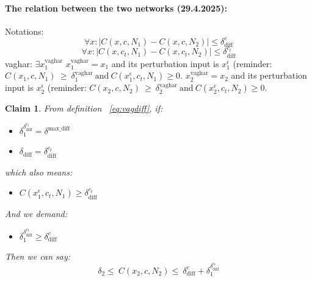\documentclass[11pt]{article}
\newtheorem{claim}{Claim}
\begin{document}
  \paragraph{The relation between the two networks (29.4.2025):}
  Notations:
  $$ \forall{x}: |C(x,c,N_1)-C(x,c,N_2)|\leq \delta^c_{\text{diff}} $$
    $$ \forall{x}: |C(x,c_t,N_1)-C(x,c_t,N_2)|\leq \delta^{c_t}_{\text{diff}} $$
    vaghar:
    $\exists{x_1^\text{vaghar}}$
    $x_1^{\text{vaghar}}=x_1$ and its perturbation input is $x_1^\epsilon$ (reminder: $C(x_1,c,N_1)\ \geq\ \delta_1^{\text{vaghar}}\ \text{and}\ C(x_1^\epsilon,c_t,N_1)\geq{0}$.
    $x_2^{\text{vaghar}}=x_2$ and its perturbation input is $x_2^\epsilon$ (reminder: $C(x_2,c,N_2)\ \geq\ \delta_2^{\text{vaghar}}\ \text{and}\ C(x_2^\epsilon,c_t,N_2)\geq{0}$.
   \begin{claim}\label{claim:trasferringVagharProofeFromN1toN2}
From definition ~\ref{eq:vagdiff}, if:
\begin{itemize}
\item $ \delta_1^{\delta^{c_t}_{\text{diff}}}=\delta^\text{max\_diff} $
\item $ \delta_\text{diff}=\delta^{c_t}_{\text{diff}}$
\end{itemize}
which also means:
\begin{itemize}
\item $C(x_1^\epsilon,c_t,N_1)\geq{\delta^{c_t}_{\text{diff}}}$
\end{itemize}
And we demand:
\begin{itemize}
\item $\delta_1^{\delta^{c_t}_{\text{diff}}}\geq{\delta^c_{\text{diff}}}$
\end{itemize}
Then we can say:
$$ \delta_2 \leq\ C(x_2,c,N_2) \leq\ \delta^c_\text{diff}+\delta_1^{\delta^{c_t}_{\text{diff}}} $$
 \end{claim}
\end{document}
